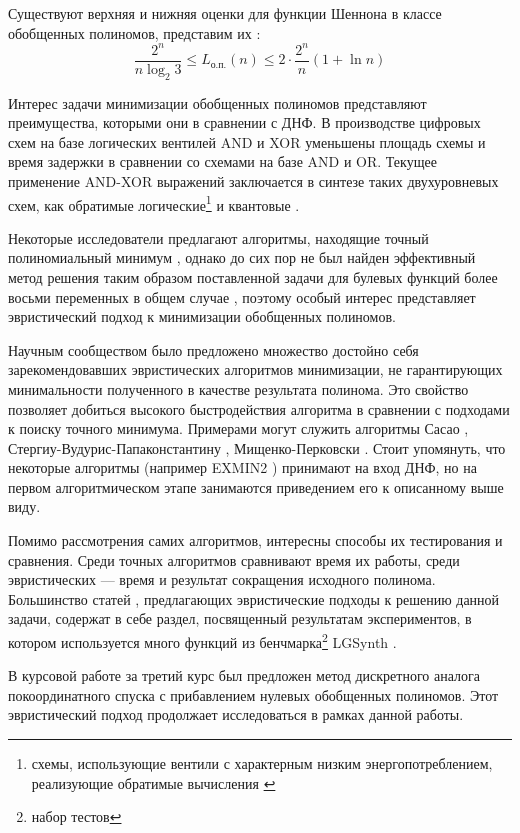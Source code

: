 \documentclass[a4paper,12pt,titlepage,finall]{article}
\begin{document}
Существуют верхняя и нижняя оценки для функции Шеннона в классе обобщенных полиномов, представим их \cite{selezn}:
$$ \frac{2^n}{n \log_2 3} \le L_\text{о.п.}(n) \le 2 \cdot \frac{2^n}{n} (1 + \ln n) $$

Интерес задачи минимизации обобщенных полиномов представляют преимущества, которыми они в сравнении с ДНФ. В производстве цифровых схем на базе логических вентилей \textsc{AND} и \textsc{XOR} уменьшены площадь схемы и время задержки \cite{delay} в сравнении со схемами на базе \textsc{AND} и \textsc{OR}. Текущее применение \textsc{AND-XOR} выражений заключается в синтезе таких двухуровневых схем, как обратимые логические\footnote{схемы, использующие вентили с характерным низким энергопотреблением, реализующие обратимые вычисления \cite{revsynth}} \cite{reversible} и квантовые \cite{quantum}.

Некоторые исследователи предлагают алгоритмы, находящие точный полиномиальный минимум \cite{min-tau} \cite{exact6} \cite{exact}, однако до сих пор не был найден эффективный метод решения таким образом поставленной задачи для булевых функций более восьми переменных в общем случае \cite{exact8}, поэтому особый интерес представляет эвристический подход к минимизации обобщенных полиномов.

Научным сообществом было предложено множество достойно себя зарекомендовавших эвристических алгоритмов минимизации, не гарантирующих минимальности полученного в качестве результата полинома. Это свойство позволяет добиться высокого быстродействия алгоритма в сравнении с подходами к поиску точного минимума. Примерами могут служить алгоритмы Сасао \cite{exmin2}, Стергиу-Вудурис-Папаконстантину \cite{mvesopmin}, Мищенко-Перковски \cite{exorcism4}. Стоит упомянуть, что некоторые алгоритмы (например \textsc{EXMIN2} \cite{exmin2}) принимают на вход ДНФ, но на первом алгоритмическом этапе занимаются приведением его к описанному выше виду.

Помимо рассмотрения самих алгоритмов, интересны способы их тестирования и сравнения. Среди точных алгоритмов сравнивают время их работы, среди эвристических --- время и результат сокращения исходного полинома. Большинство статей \cite{exmin2} \cite{mint} \cite{exorcism4}, предлагающих эвристические подходы к решению данной задачи, содержат в себе раздел, посвященный результатам экспериментов, в котором используется много функций из бенчмарка\footnote{набор тестов} LGSynth \cite{benchmark}.

В курсовой работе за третий курс был предложен метод дискретного аналога покоординатного спуска с прибавлением нулевых обобщенных полиномов. Этот эвристический подход продолжает исследоваться в рамках данной работы.
\end{document}
